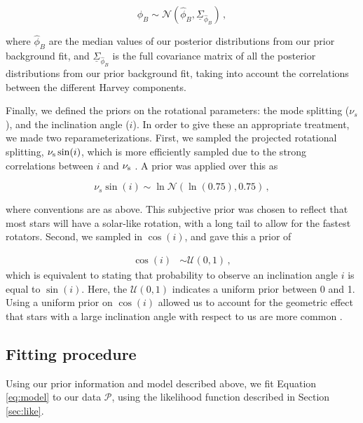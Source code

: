 \begin{equation}
	\phi_{B}\sim\mathcal{N}(\hat{\phi}_{B},\underline{\Sigma}_{\hat{\phi}_{B}})\, ,
\end{equation}

\noindent where $\hat{\phi}_B$ are the median values of our posterior distributions from our prior background fit, and $\underline{\Sigma}_{\hat{\phi}_{B}}$ is the full covariance matrix of all the posterior distributions from our prior background fit, taking into account the correlations between the different Harvey components.

Finally, we defined the priors on the rotational parameters: the mode splitting ($\nu_s$), and the inclination angle ($i$). In order to give these an appropriate treatment, we made two reparameterizations. First, we sampled the projected rotational splitting, $\nu_{\rm{s}}\sin(i)$, which is more efficiently sampled due to the strong correlations between $i$ and $\nu_{\rm s}$ \cite{ballot+2006,ballot+2008a}. A prior was applied over this as

\begin{equation}
	\nu_s\sin(i) \sim \ln\mathcal{N}(\ln(0.75), 0.75)\, ,
\end{equation}

\noindent where conventions are as above. This subjective prior was chosen to reflect that most stars will have a solar-like rotation, with a long tail to allow for the fastest rotators. Second, we sampled in $\cos(i)$, and gave this a prior of

\begin{equation}
	\begin{split}
		\cos(i) &\sim \mathcal{U}(0, 1)\, ,
	\end{split}
\end{equation}
which is equivalent to stating that probability to observe an inclination angle $i$ is equal to $\sin(i)$. Here, the $\mathcal{U}(0,1)$ indicates a uniform prior between 0 and 1. Using a uniform prior on $\cos(i)$ allowed us to account for the geometric effect that stars with a large inclination angle with respect to us are more common \cite{chaplin+basu2017}.

\subsection{Fitting procedure}
Using our prior information and model described above, we fit Equation \ref{eq:model} to our data $\mathcal{P}$, using the likelihood function described in Section \ref{sec:like}.

